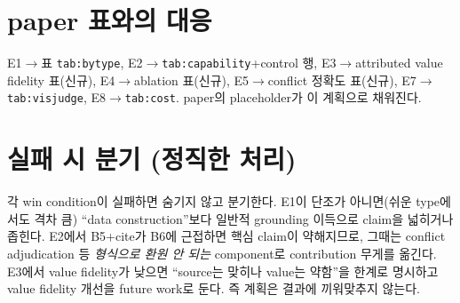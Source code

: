 \documentclass[11pt]{article}
\begin{document}
\section{paper 표와의 대응}

E1$\rightarrow$표 \texttt{tab:bytype}, E2$\rightarrow$\texttt{tab:capability}+control 행,
E3$\rightarrow$attributed value fidelity 표(신규), E4$\rightarrow$ablation 표(신규),
E5$\rightarrow$conflict 정확도 표(신규), E7$\rightarrow$\texttt{tab:visjudge},
E8$\rightarrow$\texttt{tab:cost}. paper의 placeholder가 이 계획으로 채워진다.

\section{실패 시 분기 (정직한 처리)}

각 win condition이 실패하면 숨기지 않고 분기한다. E1이 단조가 아니면(쉬운 type에서도 격차 큼)
``data construction''보다 일반적 grounding 이득으로 claim을 넓히거나 좁힌다. E2에서 B5+cite가
B6에 근접하면 핵심 claim이 약해지므로, 그때는 conflict adjudication 등 \emph{형식으로 환원 안 되는}
component로 contribution 무게를 옮긴다. E3에서 value fidelity가 낮으면 ``source는 맞히나 value는
약함''을 한계로 명시하고 value fidelity 개선을 future work로 둔다. 즉 계획은 결과에 끼워맞추지
않는다.
\end{document}
